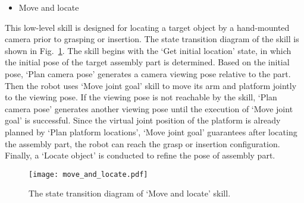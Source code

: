 \begin{itemize}
\item Move and locate
\end{itemize}
This low-level skill is designed for locating a target object by a hand-mounted camera prior to grasping or insertion. The state transition diagram of the skill is shown in Fig.~\ref{fig:move_and_locate_skill}. The skill begins with the `Get initial location' state, in which the initial pose of the target assembly part is determined. Based on the initial pose, `Plan camera pose' generates a camera viewing pose relative to the part. Then the robot uses `Move joint goal' skill to move its arm and platform jointly to the viewing pose. If the viewing pose is not reachable by the skill, `Plan camera pose' generates another viewing pose until the execution of  `Move joint goal' is successful. Since the virtual joint position of the platform is already planned by `Plan platform locations', `Move joint goal' guarantees after locating the assembly part, the robot can reach the grasp or insertion configuration. Finally, a `Locate object' is conducted to refine the pose of assembly part. 
\begin{figure}[!htbp]
\centering
\texttt{[image: move\_and\_locate.pdf]}
\captionsetup{justification=raggedright}
\caption{The state transition diagram of `Move and locate' skill.}
\label{fig:move_and_locate_skill}
\end{figure}


